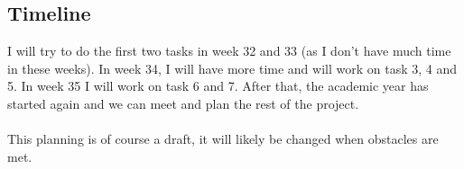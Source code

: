 \subsection{Timeline}
I will try to do the first two tasks in week 32 and 33 (as I don't have much time in these weeks). In week 34, I will have more time and will work on task 3, 4 and 5. In week 35 I will work on task 6 and 7. After that, the academic year has started again and we can meet and plan the rest of the project. \\
\\
This planning is of course a draft, it will likely be changed when obstacles are met.